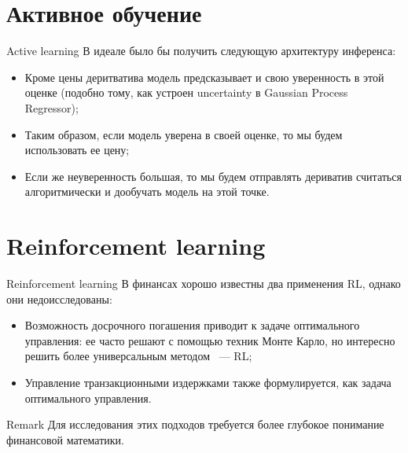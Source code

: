\documentclass[10pt]{beamer}
\begin{document}
    \section{Активное обучение}
    \begin{frame}{Active learning}
        В идеале было бы получить следующую архитектуру инференса:
        \begin{itemize}
            \item Кроме цены деритватива модель предсказывает и свою уверенность в этой оценке (подобно тому, как устроен uncertainty в Gaussian Process Regressor);
            \item Таким образом, если модель уверена в своей оценке, то мы будем использовать ее цену;
            \item Если же неуверенность большая, то мы будем отправлять дериватив считаться алгоритмически и дообучать модель на этой точке.
        \end{itemize}
    \end{frame}

    \section{Reinforcement learning}
    \begin{frame}{Reinforcement learning}
        В финансах хорошо известны два применения RL, однако они недоисследованы:
        \begin{itemize}
            \item Возможность досрочного погашения приводит к задаче оптимального управления: 
            ее часто решают с помощью техник Монте Карло, но интересно решить более универсальным методом ~--- RL;
            \item Управление транзакционными издержками также формулируется, как задача оптимального управления.
        \end{itemize}

        \begin{block}{Remark}
            Для исследования этих подходов требуется более глубокое понимание финансовой математики.
        \end{block}
    \end{frame}
\end{document}
